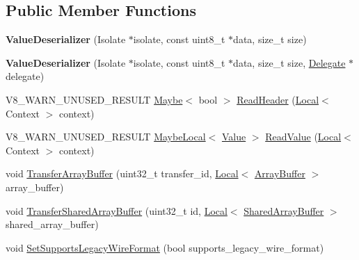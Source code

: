 \subsection*{Public Member Functions}
\begin{DoxyCompactItemize}
\item 
\mbox{\label{classv8_1_1ValueDeserializer_a8ffab323ccaa68672041bb8cb2171187}} 
{\bfseries Value\+Deserializer} (Isolate $\ast$isolate, const uint8\+\_\+t $\ast$data, size\+\_\+t size)
\item 
\mbox{\label{classv8_1_1ValueDeserializer_a122d1594dae10113a3a56a6f924d5c70}} 
{\bfseries Value\+Deserializer} (Isolate $\ast$isolate, const uint8\+\_\+t $\ast$data, size\+\_\+t size, \mbox{\hyperlink{classv8_1_1ValueDeserializer_1_1Delegate}{Delegate}} $\ast$delegate)
\item 
V8\+\_\+\+W\+A\+R\+N\+\_\+\+U\+N\+U\+S\+E\+D\+\_\+\+R\+E\+S\+U\+LT \mbox{\hyperlink{classv8_1_1Maybe}{Maybe}}$<$ bool $>$ \mbox{\hyperlink{classv8_1_1ValueDeserializer_a5b6c24dcdd0fa8b241cf45d058f1270c}{Read\+Header}} (\mbox{\hyperlink{classv8_1_1Local}{Local}}$<$ Context $>$ context)
\item 
V8\+\_\+\+W\+A\+R\+N\+\_\+\+U\+N\+U\+S\+E\+D\+\_\+\+R\+E\+S\+U\+LT \mbox{\hyperlink{classv8_1_1MaybeLocal}{Maybe\+Local}}$<$ \mbox{\hyperlink{classv8_1_1Value}{Value}} $>$ \mbox{\hyperlink{classv8_1_1ValueDeserializer_ad1697f04cf0fae2f80d5750d6fe9c4da}{Read\+Value}} (\mbox{\hyperlink{classv8_1_1Local}{Local}}$<$ Context $>$ context)
\item 
void \mbox{\hyperlink{classv8_1_1ValueDeserializer_a853acc2c7b30571d6719ddd92a48da3b}{Transfer\+Array\+Buffer}} (uint32\+\_\+t transfer\+\_\+id, \mbox{\hyperlink{classv8_1_1Local}{Local}}$<$ \mbox{\hyperlink{classv8_1_1ArrayBuffer}{Array\+Buffer}} $>$ array\+\_\+buffer)
\item 
void \mbox{\hyperlink{classv8_1_1ValueDeserializer_a3730fe24f81054d6f75a1b23f77a0e6c}{Transfer\+Shared\+Array\+Buffer}} (uint32\+\_\+t id, \mbox{\hyperlink{classv8_1_1Local}{Local}}$<$ \mbox{\hyperlink{classv8_1_1SharedArrayBuffer}{Shared\+Array\+Buffer}} $>$ shared\+\_\+array\+\_\+buffer)
\item 
void \mbox{\hyperlink{classv8_1_1ValueDeserializer_a076d92b67d68c64404f1065d0dcd85b6}{Set\+Supports\+Legacy\+Wire\+Format}} (bool supports\+\_\+legacy\+\_\+wire\+\_\+format)
\item 

\end{DoxyCompactItemize}
